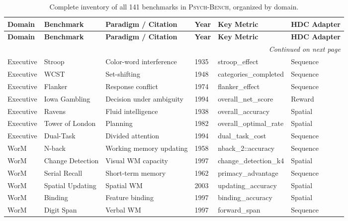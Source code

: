 \documentclass[10pt,landscape]{article}
\newcommand{\psychbench}{\textsc{Psych-Bench}}
\begin{document}
\renewcommand{\arraystretch}{1.15}
\begin{longtable}{@{}p{2.3cm}p{3.0cm}p{4.5cm}p{0.6cm}p{3.8cm}p{1.8cm}@{}}
\caption{Complete inventory of all 141 benchmarks in \psychbench{}, organized by domain.} \label{tab:s1} \\
\toprule
\textbf{Domain} & \textbf{Benchmark} & \textbf{Paradigm / Citation} & \textbf{Year} & \textbf{Key Metric} & \textbf{HDC Adapter} \\
\midrule
\endfirsthead
\toprule
\textbf{Domain} & \textbf{Benchmark} & \textbf{Paradigm / Citation} & \textbf{Year} & \textbf{Key Metric} & \textbf{HDC Adapter} \\
\midrule
\endhead
\midrule
\multicolumn{6}{r}{\emph{Continued on next page}} \\
\endfoot
\bottomrule
\endlastfoot

Executive & Stroop & Color-word interference \citep{stroop1935interference} & 1935 & stroop\_effect & Sequence \\
Executive & WCST & Set-shifting \citep{berg1948simple} & 1948 & categories\_completed & Sequence \\
Executive & Flanker & Response conflict \citep{eriksen1974effects} & 1974 & flanker\_effect & Sequence \\
Executive & Iowa Gambling & Decision under ambiguity \citep{bechara1994insensitivity} & 1994 & overall\_net\_score & Reward \\
Executive & Ravens & Fluid intelligence \citep{raven1938progressive} & 1938 & overall\_accuracy & Spatial \\
Executive & Tower of London & Planning \citep{shallice1982specific} & 1982 & overall\_optimal\_rate & Spatial \\
Executive & Dual-Task & Divided attention \citep{pashler1994dual} & 1994 & dual\_task\_cost & Sequence \\

\midrule
WorM & N-back & Working memory updating \citep{jaeggi2010relationship} & 1958 & nback\_2::accuracy & Sequence \\
WorM & Change Detection & Visual WM capacity \citep{luck1997capacity} & 1997 & change\_detection\_k4 & Spatial \\
WorM & Serial Recall & Short-term memory \citep{murdock1962serial} & 1962 & primacy\_advantage & Sequence \\
WorM & Spatial Updating & Spatial WM \citep{oberauer2003selective} & 2003 & updating\_accuracy & Spatial \\
WorM & Binding & Feature binding \citep{luck1997capacity} & 1997 & binding\_accuracy & Spatial \\
WorM & Digit Span & Verbal WM \citep{wechsler2008wais} & 1997 & forward\_span & Sequence \\


\end{longtable}
\end{document}
